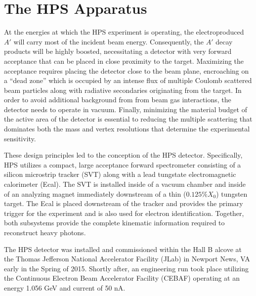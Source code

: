 
\chapter{The HPS Apparatus}


At the energies at which the HPS experiment is operating, the 
electroproduced $A'$ will carry most of the incident beam energy. Consequently,
the $A'$ decay products will be highly boosted, necessitating a detector with very
forward acceptance that can be placed in close proximity to the target.
Maximizing the acceptance requires placing the detector close to the beam plane,
encroaching on a ``dead zone'' which is occupied by an intense flux of multiple
Coulomb scattered beam particles along with radiative secondaries originating
from the target.  In order to avoid additional background from from beam gas
interactions, the detector needs to operate in vacuum. Finally, minimizing the
material budget of the active area of the detector is essential to reducing the
multiple scattering that dominates both the mass and vertex resolutions that
determine the experimental sensitivity.

These design principles led to the conception of the HPS detector.  
Specifically, HPS utilizes a compact, large acceptance forward spectrometer 
consisting of a silicon microstrip tracker (SVT) along with a lead tungstate
electromagnetic calorimeter (Ecal).  The SVT is installed inside of a vacuum
chamber and inside of an analyzing magnet immediately downstream of a thin
($0.125\%X_{0}$) tungsten target.
The Ecal is placed downstream of the tracker and provides the primary 
trigger for the experiment and is also used for electron identification. Together, 
both subsystems provide the complete kinematic information required to 
reconstruct heavy photons.

The HPS detector was installed and commissioned within the Hall B alcove at the
Thomas Jefferson National Accelerator Facility (JLab) in Newport News, VA early
in the Spring of 2015. Shortly after, an engineering run took place utilizing
the Continuous Electron Beam Accelerator Facility (CEBAF) operating at an 
energy 1.056 GeV and current of 50 nA.

